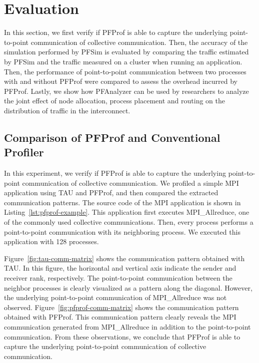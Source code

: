 \section{Evaluation}\label{sec:ii-evaluation}

In this section, we first verify if PFProf is able to capture the underlying
point-to-point communication of collective communication. Then, the accuracy
of the simulation performed by PFSim is evaluated by comparing the traffic
estimated by PFSim and the traffic measured on a cluster when running an
application. Then, the performance of point-to-point communication between two
processes with and without PFProf were compared to assess the overhead
incurred by PFProf. Lastly, we show how PFAnalyzer can be used by researchers
to analyze the joint effect of node allocation, process placement and routing
on the distribution of traffic in the interconnect.

\subsection{Comparison of PFProf and Conventional Profiler}%
\label{sec:ii-eval-pfprof}

In this experiment, we verify if PFProf is able to capture the underlying
point-to-point communication of collective communication. We profiled a simple
MPI application using  TAU and PFProf, and then compared the extracted
communication patterns. The source code of the MPI application is shown in
Listing~\ref{lst:pfprof-example}. This application first executes
MPI\_Allreduce, one of the commonly used collective communications. Then,
every process performs a point-to-point communication with its neighboring
process. We executed this application with 128 processes.

Figure~\ref{fig:tau-comm-matrix} shows the communication pattern obtained with
TAU\@. In this figure, the horizontal and vertical axis indicate the sender and
receiver rank, respectively. The point-to-point communication between the
neighbor processes is clearly visualized as  a pattern along the diagonal.
However, the underlying point-to-point communication of MPI\_Allreduce was not
observed. Figure~\ref{fig:pfprof-comm-matrix} shows the communication pattern
obtained with PFProf. This communication pattern clearly reveals the MPI
communication generated from MPI\_Allreduce in addition to the point-to-point
communication. From these observations, we conclude that PFProf is able to
capture the underlying point-to-point communication of collective
communication.

